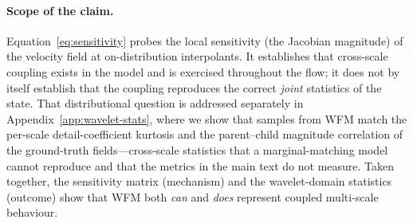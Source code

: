 \paragraph{Scope of the claim.}
Equation~\eqref{eq:sensitivity} probes the local sensitivity (the Jacobian
magnitude) of the velocity field at on-distribution interpolants. It establishes
that cross-scale coupling exists in the model and is exercised throughout the
flow; it does not by itself establish that the coupling reproduces the correct
\emph{joint} statistics of the state. That distributional question is addressed
separately in Appendix~\ref{app:wavelet-stats}, where we show that samples from
WFM match the per-scale detail-coefficient kurtosis and the parent--child
magnitude correlation of the ground-truth fields---cross-scale statistics that a
marginal-matching model cannot reproduce and that the metrics in the main text
do not measure. Taken together, the sensitivity matrix (mechanism) and the
wavelet-domain statistics (outcome) show that WFM both \emph{can} and
\emph{does} represent coupled multi-scale behaviour.
